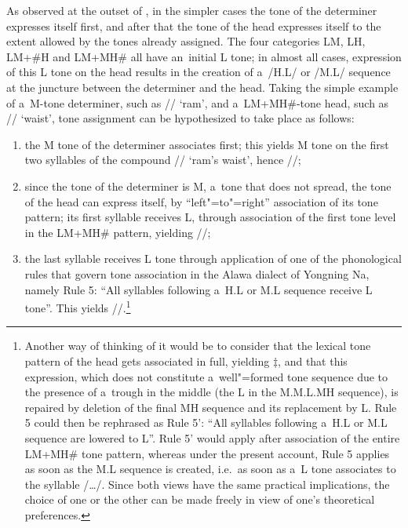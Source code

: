 As observed at the outset of , in the
simpler cases the tone of the determiner expresses itself first, and after that the tone of the head
expresses itself to the extent allowed by the tones already assigned. The four categories LM, LH,
LM+\#H and LM+MH\# all have an~initial L tone; in almost all cases, expression of this L tone on the head
results in the creation of a~/H.L/ or /M.L/ sequence at the juncture between the determiner and the head. Taking the simple example of a~M-tone determiner,
such as // ‘ram’, and a~LM+MH\#-tone head, such as // ‘waist’, tone
assignment can be hypothesized to take place as follows: 

\begin{enumerate}[label=(\roman*)]
	\item  the M tone of the
	determiner associates first; this yields M tone on the first two syllables of the compound //
	‘ram’s waist’, hence //;
	
	\item  since the tone of the determiner is M, a~tone that
	does not spread, the tone of the head can express itself, by “left"=to"=right” association of its tone
	pattern; its first syllable receives L, through association of the first tone level in the LM+MH\#
	pattern, yielding //;
	
	\item  the last syllable receives L tone through application
	of one of the phonological rules that govern tone association in the Alawa dialect of Yongning Na, namely Rule 5: “All syllables following a~H.L or M.L sequence receive L tone”. This yields //.\footnote{Another way of thinking of it would be to consider that the lexical tone pattern of the head gets associated in full, yielding $\ddagger${\kern2pt}, and that this expression, which does not constitute
	a~well"=formed tone sequence due to the presence of a~trough in the middle (the L in the M.M.L.MH
	sequence), is repaired by deletion of the final MH sequence and its replacement by L. Rule 5 could
	then be rephrased as Rule 5’: “All syllables following a~H.L or M.L sequence are lowered to L”. Rule
	5’ would apply after association of the entire LM+MH\# tone pattern, whereas under the present
	account, Rule 5 applies as soon as the M.L sequence is created, i.e.\ as soon as a~L tone associates to
	the syllable /{\dots}/. Since both views have the same practical implications, the choice of one or the other can be made freely in view of one’s theoretical
	preferences.}
\end{enumerate}

